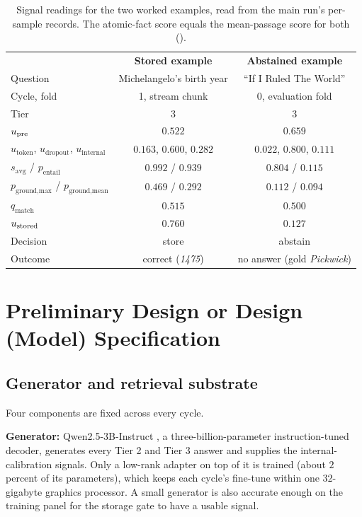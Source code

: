 \begin{table}[!htbp]
\centering
\small
\begin{tabular}{@{}lcc@{}}
\toprule
 & \textbf{Stored example} & \textbf{Abstained example} \\
Question & Michelangelo's birth year & ``If I Ruled The World'' \\
\midrule
Cycle, fold & 1, stream chunk & 0, evaluation fold \\
Tier & 3 & 3 \\
$u_{\text{pre}}$ & $0.522$ & $0.659$ \\
$u_{\text{token}}$, $u_{\text{dropout}}$, $u_{\text{internal}}$ & $0.163$, $0.600$, $0.282$ & $0.022$, $0.800$, $0.111$ \\
$s_{\text{avg}}$ / $p_{\text{entail}}$ & $0.992$ / $0.939$ & $0.804$ / $0.115$ \\
$p_{\text{ground,max}}$ / $p_{\text{ground,mean}}$ & $0.469$ / $0.292$ & $0.112$ / $0.094$ \\
$q_{\text{match}}$ & $0.515$ & $0.500$ \\
\midrule
$u_{\text{stored}}$ & $\mathbf{0.760}$ & $\mathbf{0.127}$ \\
Decision & store & abstain \\
Outcome & correct (\emph{1475}) & no answer (gold \emph{Pickwick}) \\
\bottomrule
\end{tabular}
\caption[Signal readings for the two worked examples.]{Signal readings for the two worked examples, read from the main run's per-sample records. The atomic-fact score equals the mean-passage score for both ().}
\label{tab:worked-example}
\end{table}

\section{Preliminary Design or Design (Model) Specification}
\label{sec:design-spec}



\subsection{Generator and retrieval substrate}
\label{sec:gen-retrieval}

Four components are fixed across every cycle.

\textbf{Generator:} Qwen2.5-3B-Instruct \cite{qwen25}, a three-billion-parameter instruction-tuned decoder, generates every Tier 2 and Tier 3 answer and supplies the internal-calibration signals. Only a low-rank adapter on top of it is trained (about $2$ percent of its parameters), which keeps each cycle's fine-tune within one $32$-gigabyte graphics processor. A small generator is also accurate enough on the training panel for the storage gate to have a usable signal.

